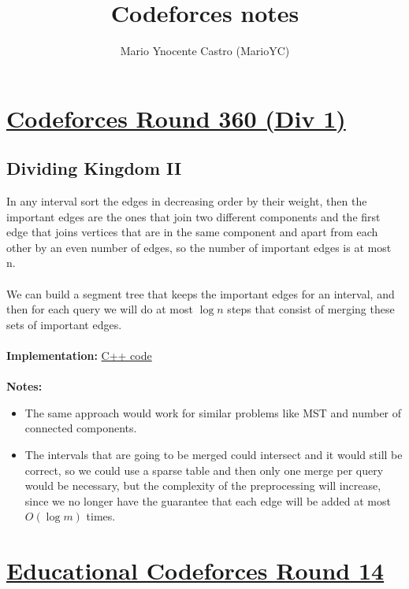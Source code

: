 \documentclass[a4paper,12pt]{article}
\title{Codeforces notes}
\author{Mario Ynocente Castro (MarioYC)}
\date{}
\begin{document}
\maketitle
\thispagestyle{empty}

\newpage
\tableofcontents

\newpage
\section{\href{http://codeforces.com/contest/687}{Codeforces Round 360 (Div 1)}}

\subsection{Dividing Kingdom II}

In any interval sort the edges in decreasing order by their weight, then the important edges are the ones that join two different components and the first edge that joins vertices that are in the same component and apart from each other by an even number of edges, so the number of important edges is at most n.
\\ \\
We can build a segment tree that keeps the important edges for an interval, and then for each query we will do at most $\log n$ steps that consist of merging these sets of important edges.
\\ \\
\textbf{Implementation:} \href{http://codeforces.com/contest/687/submission/19196725}{C++ code}
\\ \\
\textbf{Notes:}
\begin{itemize}
\item
The same approach would work for similar problems like MST and number of connected components.
\item
The intervals that are going to be merged could intersect and it would still be correct, so we could use a sparse table and then only one merge per query would be necessary, but the complexity of the preprocessing will increase, since we no longer have the guarantee that each edge will be added at most $O(\log m)$ times.
\end{itemize}

\section{\href{http://codeforces.com/contest/691}{Educational Codeforces Round 14}}
\end{document}
